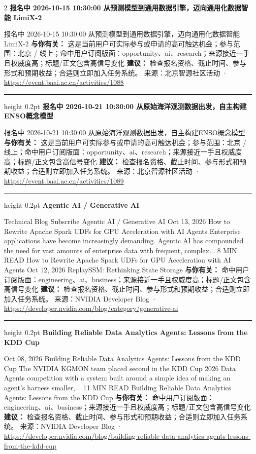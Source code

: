 \documentclass[10.5pt]{ctexart}
\begin{document}
\begin{multicols}{2}
{\large\bfseries 报名中 2026-10-15 10:30:00 从预测模型到通用数据引擎，迈向通用化数据智能 LimiX-2}\par
报名中 2026-10-15 10:30:00 从预测模型到通用数据引擎，迈向通用化数据智能 LimiX-2
\textbf{与你有关：} 这是当前用户可实际参与或申请的高可触达机会；参与范围：北京 / 线上；命中用户订阅版面：opportunity、ai、research；来源接近一手且权威度高；标题/正文包含高信号变化
\textbf{建议：} 检查报名资格、截止时间、参与形式和预期收益；合适则立即加入任务系统。
{\footnotesize\color{ormuted} 来源：北京智源社区活动 · \url{https://event.baai.ac.cn/activities/1088}}
\vspace{2mm}
\hrule height 0.2pt
\vspace{2mm}
{\large\bfseries 报名中 2026-10-21 10:30:00 从原始海‮观洋‬测数据出发，自主构建ENSO概念模型}\par
报名中 2026-10-21 10:30:00 从原始海‮观洋‬测数据出发，自主构建ENSO概念模型
\textbf{与你有关：} 这是当前用户可实际参与或申请的高可触达机会；参与范围：北京 / 线上；命中用户订阅版面：opportunity、ai、research；来源接近一手且权威度高；标题/正文包含高信号变化
\textbf{建议：} 检查报名资格、截止时间、参与形式和预期收益；合适则立即加入任务系统。
{\footnotesize\color{ormuted} 来源：北京智源社区活动 · \url{https://event.baai.ac.cn/activities/1089}}
\vspace{2mm}
\hrule height 0.2pt
\vspace{2mm}
{\large\bfseries Agentic AI / Generative AI}\par
Technical Blog Subscribe Agentic AI / Generative AI Oct 13, 2026 How to Rewrite Apache Spark UDFs for GPU Acceleration with AI Agents Enterprise applications have become increasingly demanding. Agentic AI has compounded the need for vast amounts of enterprise data with frequent, complex... 8 MIN READ How to Rewrite Apache Spark UDFs for GPU Acceleration with AI Agents Oct 12, 2026 ReplaySSM: Rethinking State Storage 
\textbf{与你有关：} 命中用户订阅版面：engineering、ai、business；来源接近一手且权威度高；标题/正文包含高信号变化
\textbf{建议：} 检查报名资格、截止时间、参与形式和预期收益；合适则立即加入任务系统。
{\footnotesize\color{ormuted} 来源：NVIDIA Developer Blog · \url{https://developer.nvidia.com/blog/category/generative-ai}}
\vspace{2mm}
\hrule height 0.2pt
\vspace{2mm}
{\large\bfseries Building Reliable Data Analytics Agents: Lessons from the KDD Cup}\par
Oct 08, 2026 Building Reliable Data Analytics Agents: Lessons from the KDD Cup The NVIDIA KGMON team placed second in the KDD Cup 2026 Data Agents competition with a system built around a simple idea of making an agent's harness smaller,... 11 MIN READ Building Reliable Data Analytics Agents: Lessons from the KDD Cup
\textbf{与你有关：} 命中用户订阅版面：engineering、ai、business；来源接近一手且权威度高；标题/正文包含高信号变化
\textbf{建议：} 检查报名资格、截止时间、参与形式和预期收益；合适则立即加入任务系统。
{\footnotesize\color{ormuted} 来源：NVIDIA Developer Blog · \url{https://developer.nvidia.com/blog/building-reliable-data-analytics-agents-lessons-from-the-kdd-cup}}
\end{multicols}
\end{document}
